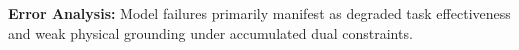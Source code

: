 \documentclass{llmxive}
\begin{document}








\begin{takeaway}
\label{sec:error-analysis}
\textbf{Error Analysis: }
Model failures primarily manifest as degraded task effectiveness and weak physical grounding under accumulated dual constraints.
\end{takeaway}


\end{document}
